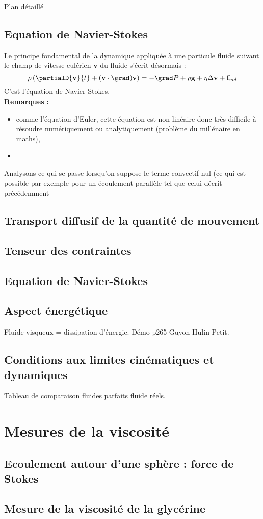 \begin{reportBlock}{Plan détaillé}
  \subsection{Equation de Navier-Stokes}
  Le principe fondamental de la dynamique appliquée à une particule fluide suivant le champ de vitesse eulérien $\mathbf{v}$ du fluide s'écrit désormais :
  \begin{equation}
      \rho\left(\partialD{\mathbf{v}}{t} + (\mathbf{v}\cdot\grad)\mathbf{v}\right) = -\grad P + \rho \mathbf{g} + \eta\Delta\mathbf{v} + \mathbf{f}_{vol}
  \end{equation}
  C'est l'équation de Navier-Stokes.\\
  \textbf{Remarques :}
  \begin{itemize}
      \item comme l'équation d'Euler, cette équation est non-linéaire donc très difficile à résoudre numériquement ou analytiquement (problème du millénaire en maths),
      \item 
  \end{itemize}
  Analysons ce qui se passe lorsqu'on suppose le terme convectif nul (ce qui est possible par exemple pour un écoulement parallèle tel que celui décrit précédemment


  \subsection{Transport diffusif de la quantité de mouvement}
\subsection{Tenseur des contraintes}

\subsection{Equation de Navier-Stokes}

\subsection{Aspect énergétique}
Fluide visqueux = dissipation d'énergie. Démo p265 Guyon Hulin Petit.
\subsection{Conditions aux limites cinématiques et dynamiques}
Tableau de comparaison fluides parfaits fluide réels.

\section{Mesures de la viscosité}
\subsection{Ecoulement autour d'une sphère : force de Stokes}
\subsection{Mesure de la viscosité de la glycérine}

\end{reportBlock}